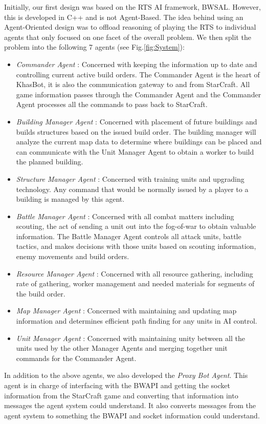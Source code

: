 \documentclass[letterpaper]{article}
\begin{document}
Initially, our first design was based on the RTS AI framework, BWSAL.  However, this is developed in C++ and is not Agent-Based. The idea behind using an Agent-Oriented design was to offload reasoning of playing the RTS to individual agents that only focused on one facet of the overall problem.  We then split the problem into the following 7 agents (see Fig.\ref{fig:System}):
\begin{itemize}
\item \emph{Commander Agent} : Concerned with keeping the information up to date and controlling current active build orders.  The Commander Agent is the heart of KhasBot, it is also the communication gateway to and from StarCraft.  All game information passes through the Commander Agent and the Commander Agent processes all the commands to pass back to StarCraft.
\item \emph{Building Manager Agent} :  Concerned with placement of future buildings and builds structures based on the issued build order.  The building manager will analyze the current map data to determine where buildings can be placed and can communicate with the Unit Manager Agent to obtain a worker to build the planned building.
\item \emph{Structure Manager Agent} : Concerned with training units and upgrading technology.  Any command that would be normally issued by a player to a building is managed by this agent.
\item \emph{Battle Manager Agent} : Concerned with all combat matters including scouting, the act of sending a unit out into the fog-of-war to obtain valuable information.  The Battle Manager Agent controls all attack units, battle tactics, and makes decisions with those units based on scouting information, enemy movements and build orders.
\item \emph{Resource Manager Agent} : Concerned with all resource gathering, including rate of gathering, worker management and needed materials for segments of the build order.
\item \emph{Map Manager Agent} : Concerned with maintaining and updating map information and determines efficient path finding for any units in AI control.
\item \emph{Unit Manager Agent} : Concerned with maintaining unity between all the units used by the other Manager Agents and merging together unit commands for the Commander Agent.
\end{itemize}

In addition to the above agents, we also developed the \emph{Proxy Bot Agent}. This agent is in charge of interfacing with the BWAPI and getting the socket information from the StarCraft game and converting that information into messages the agent system could understand.  It also converts messages from the agent system to something the BWAPI and socket information could understand.
\end{document}
